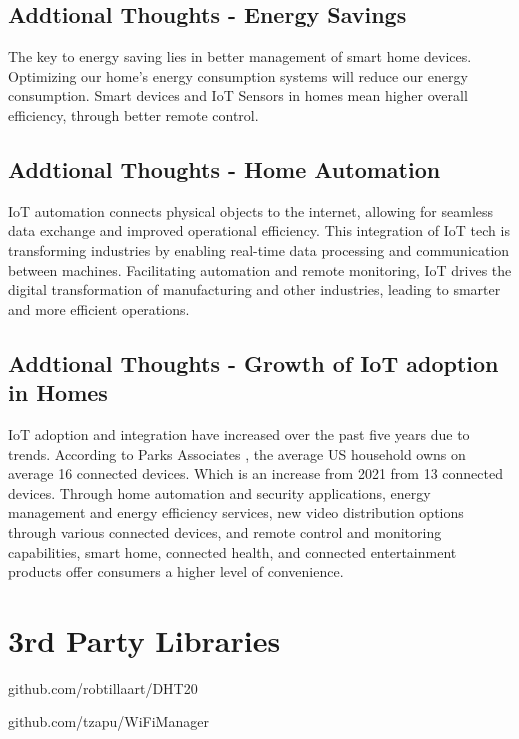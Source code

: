 \documentclass[10pt, journal]{IEEEtran} %
\begin{document}
\subsection{Addtional Thoughts - Energy Savings}

The key to energy saving lies in better management of smart home devices. 
Optimizing our home's energy consumption systems will reduce our energy consumption. 
Smart devices and IoT Sensors in homes mean higher overall efficiency, through better remote control.

\subsection{Addtional Thoughts - Home Automation}

IoT automation connects physical objects to the internet, 
allowing for seamless data exchange and improved operational efficiency. 
This integration of IoT tech is transforming industries by enabling real-time data processing and communication between machines. 
Facilitating automation and remote monitoring, IoT drives the digital transformation of manufacturing and other industries, 
leading to smarter and more efficient operations. 

\subsection{Addtional Thoughts - Growth of IoT adoption in Homes}

IoT adoption and integration have increased over the past five years due to trends. 
According to Parks Associates \cite[Parks]{Parks}, the average US household owns on average 16 connected devices. 
Which is an increase from 2021 from 13 connected devices. 
Through home automation and security applications, energy management and energy efficiency services, 
new video distribution options through various connected devices, and remote control and monitoring capabilities, 
smart home, connected health, and connected entertainment products offer consumers a higher level of convenience. 



    
    

\section*{3rd Party Libraries}
github.com/robtillaart/DHT20

github.com/tzapu/WiFiManager
\end{document}
